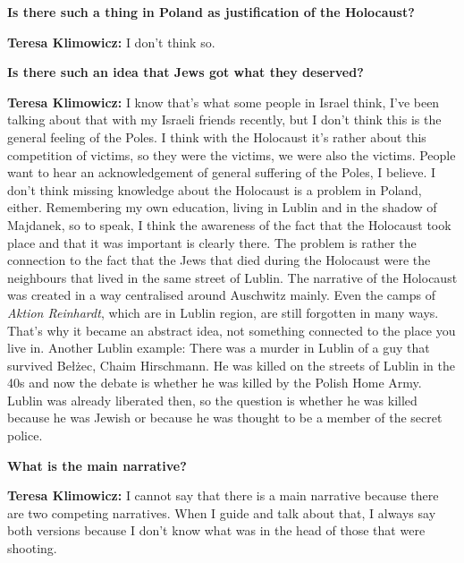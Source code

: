 \textbf{Is there such a thing in Poland as justification of the Holocaust?}  

\textbf{Teresa Klimowicz:} I don't think so.  

\textbf{Is there such an idea that Jews got what they deserved?}

\textbf{Teresa Klimowicz:} I know that's what some people in Israel think, I've been talking about that with my Israeli friends recently, but I don't think this is the general feeling of the Poles. I think with the Holocaust it’s rather about this competition of victims, so they were the victims, we were also the victims. People want to hear an acknowledgement of general suffering of the Poles, I believe. I don't think missing knowledge about the Holocaust is a problem in Poland, either. Remembering my own education, living in Lublin and in the shadow of Majdanek, so to speak, I think the awareness of the fact that the Holocaust took place and that it was important is clearly there. The problem is rather the connection to the fact that the Jews that died during the Holocaust were the neighbours that lived in the same street of Lublin. The narrative of the Holocaust was created in a way centralised around Auschwitz mainly. Even the camps of \textit{Aktion Reinhardt}, which are in Lublin region, are still forgotten in many ways. That's why it became an abstract idea, not something connected to the place you live in. Another Lublin example: There was a murder in Lublin of a guy that survived Bełżec, Chaim Hirschmann. He was killed on the streets of Lublin in the 40s and now the debate is whether he was killed by the Polish Home Army. Lublin was already liberated then, so the question is whether he was killed because he was Jewish or because he was thought to be a member of the secret police.  

\textbf{What is the main narrative?}  

\textbf{Teresa Klimowicz:} I cannot say that there is a main narrative because there are two competing narratives. When I guide and talk about that, I always say both versions because I don't know what was in the head of those that were shooting. 
